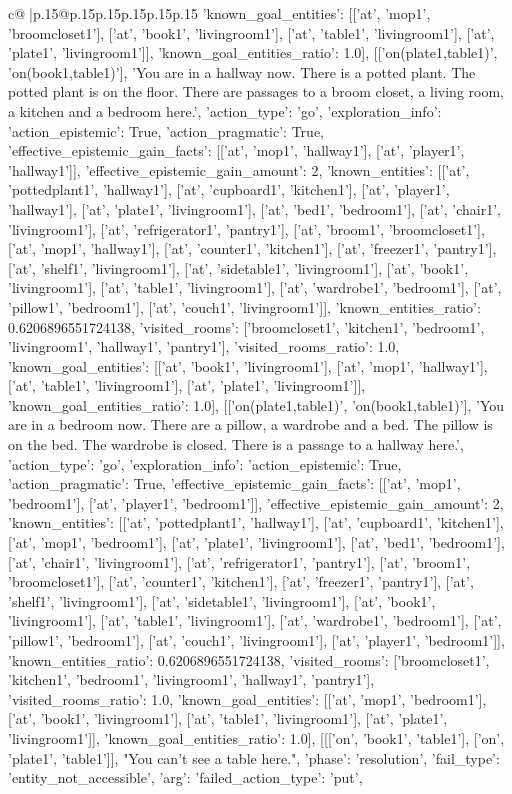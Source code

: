 \documentclass{article}
\begin{document}
{\begin{supertabular}{c@{$\;$}|p{.15\linewidth}@{}p{.15\linewidth}p{.15\linewidth}p{.15\linewidth}p{.15\linewidth}p{.15\linewidth}}
{{{'known_goal_entities': [['at', 'mop1', 'broomcloset1'], ['at', 'book1', 'livingroom1'], ['at', 'table1', 'livingroom1'], ['at', 'plate1', 'livingroom1']], 'known_goal_entities_ratio': 1.0}}], [['on(plate1,table1)', 'on(book1,table1)'], 'You are in a hallway now. There is a potted plant. The potted plant is on the floor. There are passages to a broom closet, a living room, a kitchen and a bedroom here.', {'action_type': 'go', 'exploration_info': {'action_epistemic': True, 'action_pragmatic': True, 'effective_epistemic_gain_facts': [['at', 'mop1', 'hallway1'], ['at', 'player1', 'hallway1']], 'effective_epistemic_gain_amount': 2, 'known_entities': [['at', 'pottedplant1', 'hallway1'], ['at', 'cupboard1', 'kitchen1'], ['at', 'player1', 'hallway1'], ['at', 'plate1', 'livingroom1'], ['at', 'bed1', 'bedroom1'], ['at', 'chair1', 'livingroom1'], ['at', 'refrigerator1', 'pantry1'], ['at', 'broom1', 'broomcloset1'], ['at', 'mop1', 'hallway1'], ['at', 'counter1', 'kitchen1'], ['at', 'freezer1', 'pantry1'], ['at', 'shelf1', 'livingroom1'], ['at', 'sidetable1', 'livingroom1'], ['at', 'book1', 'livingroom1'], ['at', 'table1', 'livingroom1'], ['at', 'wardrobe1', 'bedroom1'], ['at', 'pillow1', 'bedroom1'], ['at', 'couch1', 'livingroom1']], 'known_entities_ratio': 0.6206896551724138, 'visited_rooms': ['broomcloset1', 'kitchen1', 'bedroom1', 'livingroom1', 'hallway1', 'pantry1'], 'visited_rooms_ratio': 1.0, 'known_goal_entities': [['at', 'book1', 'livingroom1'], ['at', 'mop1', 'hallway1'], ['at', 'table1', 'livingroom1'], ['at', 'plate1', 'livingroom1']], 'known_goal_entities_ratio': 1.0}}], [['on(plate1,table1)', 'on(book1,table1)'], 'You are in a bedroom now. There are a pillow, a wardrobe and a bed. The pillow is on the bed. The wardrobe is closed. There is a passage to a hallway here.', {'action_type': 'go', 'exploration_info': {'action_epistemic': True, 'action_pragmatic': True, 'effective_epistemic_gain_facts': [['at', 'mop1', 'bedroom1'], ['at', 'player1', 'bedroom1']], 'effective_epistemic_gain_amount': 2, 'known_entities': [['at', 'pottedplant1', 'hallway1'], ['at', 'cupboard1', 'kitchen1'], ['at', 'mop1', 'bedroom1'], ['at', 'plate1', 'livingroom1'], ['at', 'bed1', 'bedroom1'], ['at', 'chair1', 'livingroom1'], ['at', 'refrigerator1', 'pantry1'], ['at', 'broom1', 'broomcloset1'], ['at', 'counter1', 'kitchen1'], ['at', 'freezer1', 'pantry1'], ['at', 'shelf1', 'livingroom1'], ['at', 'sidetable1', 'livingroom1'], ['at', 'book1', 'livingroom1'], ['at', 'table1', 'livingroom1'], ['at', 'wardrobe1', 'bedroom1'], ['at', 'pillow1', 'bedroom1'], ['at', 'couch1', 'livingroom1'], ['at', 'player1', 'bedroom1']], 'known_entities_ratio': 0.6206896551724138, 'visited_rooms': ['broomcloset1', 'kitchen1', 'bedroom1', 'livingroom1', 'hallway1', 'pantry1'], 'visited_rooms_ratio': 1.0, 'known_goal_entities': [['at', 'mop1', 'bedroom1'], ['at', 'book1', 'livingroom1'], ['at', 'table1', 'livingroom1'], ['at', 'plate1', 'livingroom1']], 'known_goal_entities_ratio': 1.0}}], [[['on', 'book1', 'table1'], ['on', 'plate1', 'table1']], "You can't see a table here.", {'phase': 'resolution', 'fail_type': 'entity_not_accessible', 'arg': {'failed_action_type': 'put', }}}
\end{supertabular}}
\end{document}
